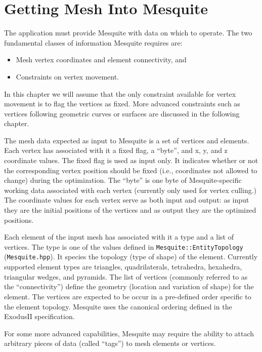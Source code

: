 \chapter{Getting Mesh Into Mesquite}
\label{sec:meshes}

The application must provide Mesquite with data on which to operate.  The two
fundamental classes of information Mesquite requires are:
\begin{itemize}
\item Mesh vertex coordinates and element connectivity, and
\item Constraints on vertex movement.
\end{itemize}
In this chapter we will assume that the only constraint available for vertex movement is to flag the vertices as fixed.  More advanced constraints such as vertices following geometric curves or surfaces are discussed in the following chapter.  

The mesh data expected as input to Mesquite is a set of vertices and elements.  Each vertex has associated with it a fixed flag, a ``byte'', and x, y, and z coordinate values.  The fixed flag is used as input only.  It indicates whether or not the corresponding vertex position should be fixed (i.e., coordinates not allowed to change) during the optimization.  The ``byte'' is one byte of Mesquite-specific working data associated with each vertex (currently only used for vertex culling.)   The coordinate values for each vertex serve as both input and output: as input they are the initial positions of the vertices and as output they are the optimized positions.  

Each element of the input mesh has associated with it a type and a list of vertices.  The type is one of the values defined in \texttt{Mesquite::EntityTopology} (\texttt{Mesquite.hpp}).  It species the topology (type of shape) of the element. Currently supported element types are triangles, quadrilaterals, 
tetrahedra, hexahedra, triangular wedges, and pyramids.  The list of vertices (commonly referred to as the ``connectivity'') define the geometry (location and variation of shape) for the element.  The vertices are expected to be occur in a pre-defined order specific to the element topology. Mesquite uses the canonical ordering defined in the ExodusII specification\cite{exodus}.

For some more advanced capabilities, Mesquite may require the ability to attach arbitrary pieces of data (called ``tags'') to mesh elements or vertices.

